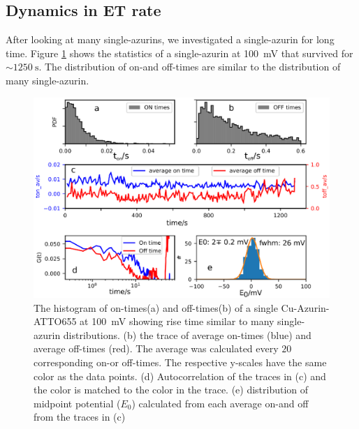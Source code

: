 \documentclass[journal=jacsat,manuscript=article]{achemso}
\begin{document}
\subsection{Dynamics in ET rate}
After looking at many single-azurins, we investigated a single-azurin for long time. 
Figure \ref{fig:long_azurin_trace} shows the statistics of a single-azurin at \SI{100}{\mV} that survived for ${\sim}\SI{1250}{\s}$.
The distribution of on-and off-times are similar to the distribution of many single-azurin.
\begin{figure}
	\centering
	\includegraphics[width=\textwidth]{long_azurin_trace}
	\caption{The histogram of on-times(a) and off-times(b) of a single Cu-Azurin-ATTO655 at \SI{100}{\mV} showing rise time similar to many single-azurin distributions.
	(b) the trace of average on-times (blue) and average off-times (red). 
	The average was calculated every $20$ corresponding on-or off-times.
	The respective y-scales have the same color as the data points.
	(d) Autocorrelation of the traces in (c) and the color is matched to the color in the trace.
	(e) distribution of midpoint potential ($E_0$) calculated from each average on-and off from the traces in (c)}
	\label{fig:long_azurin_trace}
\end{figure}
\end{document}
